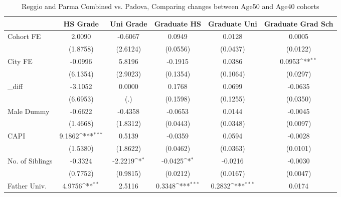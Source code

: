 \begin{table}[htbp]\centering
\def\sym#1{\ifmmode^{#1}\else\(^{#1}\)\fi}
\caption{Reggio and Parma Combined vs. Padova, Comparing changes between Age50 and Age40 cohorts}
\begin{tabular}{l*{5}{c}}
\toprule
            &\multicolumn{1}{c}{HS Grade}&\multicolumn{1}{c}{Uni Grade}&\multicolumn{1}{c}{Graduate HS}&\multicolumn{1}{c}{Graduate Uni}&\multicolumn{1}{c}{Graduate Grad Sch}\\
\midrule
Cohort FE   &      2.0090         &     -0.6067         &      0.0949         &      0.0128         &      0.0005         \\
            &    (1.8758)         &    (2.6124)         &    (0.0556)         &    (0.0437)         &    (0.0122)         \\
\addlinespace
City FE     &     -0.0996         &      5.8196         &     -0.1915         &      0.0386         &      0.0953\sym{**} \\
            &    (6.1354)         &    (2.9023)         &    (0.1354)         &    (0.1064)         &    (0.0297)         \\
\addlinespace
\_diff       &     -3.1052         &      0.0000         &      0.1768         &      0.0699         &     -0.0635         \\
            &    (6.6953)         &         (.)         &    (0.1598)         &    (0.1255)         &    (0.0350)         \\
\addlinespace
Male Dummy  &     -0.6622         &     -0.4358         &     -0.0653         &      0.0144         &     -0.0045         \\
            &    (1.4668)         &    (1.8312)         &    (0.0443)         &    (0.0348)         &    (0.0097)         \\
\addlinespace
CAPI        &      9.1862\sym{***}&      0.5139         &     -0.0359         &      0.0594         &     -0.0028         \\
            &    (1.5380)         &    (1.8622)         &    (0.0462)         &    (0.0363)         &    (0.0101)         \\
\addlinespace
No. of Siblings&     -0.3324         &     -2.2219\sym{*}  &     -0.0425\sym{*}  &     -0.0216         &     -0.0030         \\
            &    (0.7752)         &    (0.9815)         &    (0.0212)         &    (0.0167)         &    (0.0047)         \\
\addlinespace
Father Univ.&      4.9756\sym{**} &      2.5116         &      0.3348\sym{***}&      0.2832\sym{***}&      0.0174         \\

\end{tabular}
\end{table}
